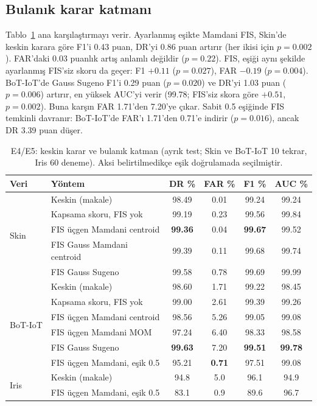 \documentclass[11pt,a4paper]{article}
\begin{document}
\subsection{Bulanık karar katmanı}

Tablo~\ref{tab:e4} ana karşılaştırmayı verir. Ayarlanmış eşikte Mamdani FIS, Skin'de keskin karara göre F1'i 0.43 puan, DR'yi 0.86 puan artırır (her ikisi için $p=0.002$). FAR'daki 0.03 puanlık artış anlamlı değildir ($p=0.22$). FIS, eşiği aynı şekilde ayarlanmış FIS'siz skoru da geçer: F1 $+0.11$ ($p=0.027$), FAR $-0.19$ ($p=0.004$). BoT-IoT'de Gauss Sugeno F1'i 0.29 puan ($p=0.020$) ve DR'yi 1.03 puan ($p=0.006$) artırır, en yüksek AUC'yi verir (99.78; FIS'siz skora göre $+0.51$, $p=0.002$). Buna karşın FAR 1.71'den 7.20'ye çıkar. Sabit 0.5 eşiğinde FIS temkinli davranır: BoT-IoT'de FAR'ı 1.71'den 0.71'e indirir ($p=0.016$), ancak DR 3.39 puan düşer.

\begin{table}[H]
\centering\small
\caption{E4/E5: keskin karar ve bulanık katman (ayrık test; Skin ve BoT-IoT 10 tekrar, Iris 60 deneme). Aksi belirtilmedikçe eşik doğrulamada seçilmiştir.}\label{tab:e4}
\begin{tabular}{@{}llcccc@{}}
\toprule
Veri & Yöntem & DR \% & FAR \% & F1 \% & AUC \% \\
\midrule
\multirow{5}{*}{Skin} & Keskin (makale) & 98.49 & 0.01 & 99.24 & 99.24 \\
 & Kapsama skoru, FIS yok & 99.19 & 0.23 & 99.56 & 99.84 \\
 & FIS üçgen Mamdani centroid & \textbf{99.36} & 0.04 & \textbf{99.67} & 99.52 \\
 & FIS Gauss Mamdani centroid & 99.39 & 0.11 & 99.68 & 99.74 \\
 & FIS Gauss Sugeno & 99.58 & 0.78 & 99.69 & 99.99 \\
\midrule
\multirow{6}{*}{BoT-IoT} & Keskin (makale) & 98.60 & 1.71 & 99.22 & 98.45 \\
 & Kapsama skoru, FIS yok & 99.00 & 2.61 & 99.39 & 99.26 \\
 & FIS üçgen Mamdani centroid & 98.56 & 5.26 & 99.05 & 99.08 \\
 & FIS üçgen Mamdani MOM & 97.24 & 6.40 & 98.33 & 98.58 \\
 & FIS Gauss Sugeno & \textbf{99.63} & 7.20 & \textbf{99.51} & \textbf{99.78} \\
 & FIS üçgen Mamdani, eşik 0.5 & 95.21 & \textbf{0.71} & 97.51 & 99.08 \\
\midrule
\multirow{2}{*}{Iris} & Keskin (makale) & 94.8 & 5.0 & 96.1 & 94.9 \\
 & FIS üçgen Mamdani, eşik 0.5 & 83.1 & 0.9 & 89.6 & 96.7 \\
\bottomrule
\end{tabular}
\end{table}
\end{document}
